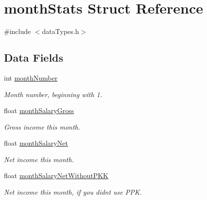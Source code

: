 \hypertarget{structmonthStats}{}\section{month\+Stats Struct Reference}
\label{structmonthStats}


{\ttfamily \#include $<$data\+Types.\+h$>$}

\subsection*{Data Fields}
\begin{DoxyCompactItemize}
\item 
\mbox{\label{structmonthStats_ade21f62c8c8e0b9b19e09ecf3a01e208}} 
int \mbox{\hyperlink{structmonthStats_ade21f62c8c8e0b9b19e09ecf3a01e208}{month\+Number}}
\begin{DoxyCompactList}\small\item\em Month number, beginning with 1. \end{DoxyCompactList}\item 
\mbox{\label{structmonthStats_a86ac2a74fa2462ee72650004ef65d77c}} 
float \mbox{\hyperlink{structmonthStats_a86ac2a74fa2462ee72650004ef65d77c}{month\+Salary\+Gross}}
\begin{DoxyCompactList}\small\item\em Gross income this month. \end{DoxyCompactList}\item 
\mbox{\label{structmonthStats_a9b843cd07db7f12d3cad140624868447}} 
float \mbox{\hyperlink{structmonthStats_a9b843cd07db7f12d3cad140624868447}{month\+Salary\+Net}}
\begin{DoxyCompactList}\small\item\em Net income this month. \end{DoxyCompactList}\item 
\mbox{\label{structmonthStats_a04ee45dac7dd14abf9a5468df828d8c3}} 
float \mbox{\hyperlink{structmonthStats_a04ee45dac7dd14abf9a5468df828d8c3}{month\+Salary\+Net\+Without\+P\+KK}}
\begin{DoxyCompactList}\small\item\em Net income this month, if you didn\textquotesingle{}t use P\+PK. \end{DoxyCompactList}\item 

\end{DoxyCompactItemize}
